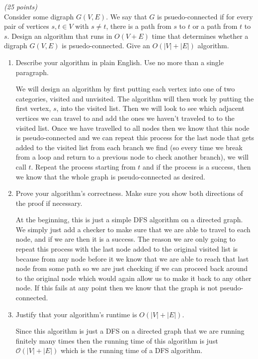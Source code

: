\documentclass{article}
\renewcommand{\O}{\mathcal{O}}
\newcounter{ProblemCounter}
\newenvironment{problem}[1][Problem]{
 \begin{trivlist}
 \item[\hskip \labelsep {\bfseries #1}\hskip \labelsep {%
 \bfseries \theProblemCounter.%
 \stepcounter{ProblemCounter}%
 }]
}{
 \end{trivlist}
}
\begin{document}
\pagebreak

\begin{problem}\textit{(25 points)}\\
Consider some digraph $G(V, E)$. We say that $G$ is psuedo-connected if for every pair of vertices $s, t \in V$ with $s \neq t$, there is a path from $s$ to $t$ or a path from $t$ to $s$. Design an algorithm that runs in $O(V + E)$ time that determines whether a digraph $G(V, E)$ is psuedo-connected. Give an $O(|V|+|E|)$ algorithm.\\
\begin{enumerate}[label=\textbf{\alph*.)}]
\item Describe your algorithm in plain English.  Use no more than a single paragraph.

We will design an algorithm by first putting each vertex into one of two categories, visited and unvisited. The algorithm will then work by putting the first vertex, $s$, into the visited list. Then we will look to see which adjacent vertices we can travel to and add the ones we haven't traveled to to the visited list. Once we have travelled to all nodes then we know that this node is pseudo-connected and we can repeat this process for the last node that gets added to the visited list from each branch we find (so every time we break from a loop and return to a previous node to check another branch), we will call $t$. Repeat the process starting from $t$ and if the process is a success, then we know that the whole graph is pseudo-connected as desired.

\item Prove your algorithm's correctness.  Make sure you show both directions of the proof if necessary.

At the beginning, this is just a simple DFS algorithm on a directed graph. We simply just add a checker to make sure that we are able to travel to each node, and if we are then it is a success. The reason we are only going to repeat this process with the last node added to the original visited list is because from any node before it we know that we are able to reach that last node from some path so we are just checking if we can proceed back around to the original node which would again allow us to make it back to any other node. If this fails at any point then we know that the graph is not pseudo-connected.

\item Justify that your algorithm's runtime is  $O(|V|+|E|)$. 

Since this algorithm is just a DFS on a directed graph that we are running finitely many times then the running time of this algorithm is just $\O(|V|+|E|)$ which is the running time of a DFS algorithm. 

\end{enumerate}
\end{problem}
\end{document}
